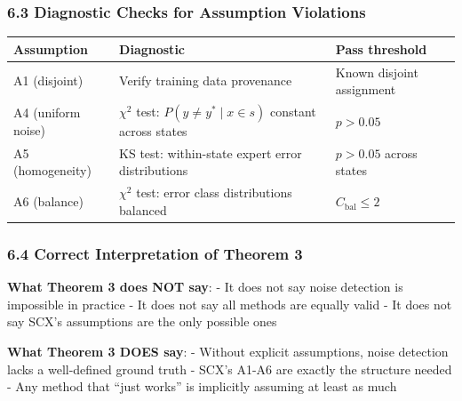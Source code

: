\documentclass[
  12pt,
]{ctexart}
\begin{document}
\subsubsection{6.3 Diagnostic Checks for Assumption
Violations}\label{diagnostic-checks-for-assumption-violations}

\begin{longtable}[]{@{}
  >{\raggedright\arraybackslash}p{}
  >{\raggedright\arraybackslash}p{}
  >{\raggedright\arraybackslash}p{}@{}}
\toprule\noalign{}
\begin{minipage}[b]{\linewidth}\raggedright
Assumption
\end{minipage} & \begin{minipage}[b]{\linewidth}\raggedright
Diagnostic
\end{minipage} & \begin{minipage}[b]{\linewidth}\raggedright
Pass threshold
\end{minipage} \\
\midrule\noalign{}
\endhead
\bottomrule\noalign{}
\endlastfoot
A1 (disjoint) & Verify training data provenance & Known disjoint
assignment \\
A4 (uniform noise) & \(\chi^2\) test: \(P(y \neq y^* \mid x \in s)\)
constant across states & \(p > 0.05\) \\
A5 (homogeneity) & KS test: within-state expert error distributions &
\(p > 0.05\) across states \\
A6 (balance) & \(\chi^2\) test: error class distributions balanced &
\(C_{\text{bal}} \leq 2\) \\
\end{longtable}

\subsubsection{6.4 Correct Interpretation of Theorem
3}\label{correct-interpretation-of-theorem-3}

\textbf{What Theorem 3 does NOT say}: - It does not say noise detection
is impossible in practice - It does not say all methods are equally
valid - It does not say SCX's assumptions are the only possible ones

\textbf{What Theorem 3 DOES say}: - Without explicit assumptions, noise
detection lacks a well-defined ground truth - SCX's A1-A6 are exactly
the structure needed - Any method that ``just works'' is implicitly
assuming at least as much
\end{document}
